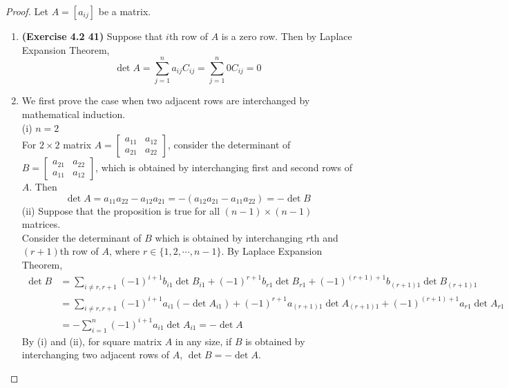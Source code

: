 \begin{proof}
	Let $A = [a_{ij}]$ be a \nbyn matrix.
	\begin{enumerate}
		\item \textbf{(Exercise 4.2 41)} Suppose that $i$th row of $A$ is a zero row. Then by Laplace Expansion Theorem,
		\begin{equation*}
			\det{A} = \sum_{j=1}^{n}a_{ij}C_{ij} = \sum_{j=1}^{n}0C_{ij} = 0
		\end{equation*}
		\item We first prove the case when two adjacent rows are interchanged by mathematical induction. \\
		
		(i) $n = 2$ \\
		For $2 \times 2$ matrix $A = \begin{bmatrix}
			a_{11} & a_{12} \\ a_{21} & a_{22}
		\end{bmatrix}$, consider the determinant of $B = \begin{bmatrix}
			a_{21} & a_{22} \\ a_{11} & a_{12}
		\end{bmatrix}$, which is obtained by interchanging first and second rows of $A$. Then
		\begin{equation*}
			\det{A} = a_{11}a_{22} - a_{12}a_{21} = -(a_{12}a_{21} - a_{11}a_{22}) = -\det{B}
		\end{equation*}
		(ii) Suppose that the proposition is true for all $(n-1) \times (n-1)$ matrices. \\
		Consider the determinant of $B$ which is obtained by interchanging $r$th and $(r+1)$th row of $A$, where $r \in \{1, 2, \cdots, n-1  \}$. By Laplace Expansion Theorem,
		\begin{align*}
			\det{B} &= \sum_{i \neq r, r+1}^{} (-1)^{i+1}b_{i1}\det{B_{i1}} + (-1)^{r+1}b_{r1}\det{B_{r1}} + (-1)^{(r+1)+1}b_{(r+1)1}\det{B_{(r+1)1}} \\
			&= \sum_{i \neq r, r+1}^{} (-1)^{i+1}a_{i1}(-\det{A_{i1}}) + (-1)^{r+1}a_{(r+1)1}\det{A_{(r+1)1}} + (-1)^{(r+1)+1}a_{r1}\det{A_{r1}} \\
			&= -\sum_{i=1}^{n}(-1)^{i+1}a_{i1}\det{A_{i1}} = -\det{A}
		\end{align*}
		By (i) and (ii), for square matrix $A$ in any size, if $B$ is obtained by interchanging two adjacent rows of $A$, $\det{B} = -\det{A}$. \\
		

\end{enumerate}
\end{proof}
